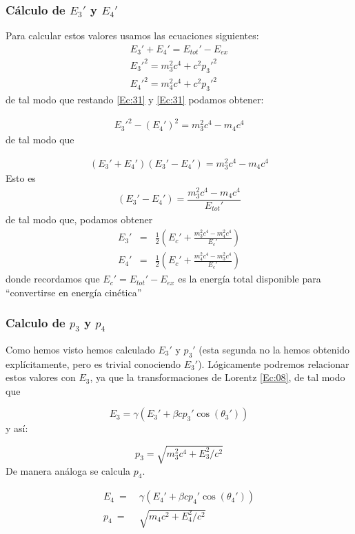 \subsubsection{Cálculo de $E_3'$ y $E_4'$}
Para calcular estos valores usamos las ecuaciones siguientes:
\begin{eqnarray}
    E_3' + E_4' = E_{tot}' - E_{ex}  \\
    E_3'^2 = m_3^2 c^4+ c^2 p_3'^2 \label{Ec:31} \\ 
    E_4'^2 = m_4^2 c^4+ c^2 p_3'^2  \label{Ec:32}
\end{eqnarray}
de tal modo que restando \ref{Ec:31} y \ref{Ec:31} podamos obtener:

\begin{eqnarray}
    E_3'^2-(E_4')^2= m_3^2c^4 - m_4c^4
\end{eqnarray}
de tal modo que

\begin{eqnarray}
   (E_3'+E_4')(E_3'-E_4') =  m_3^2c^4 - m_4c^4
\end{eqnarray}
Esto es
\begin{eqnarray}
(E_3'-E_4') =  \dfrac{m_3^2c^4 - m_4c^4}{E_{tot}'}
\end{eqnarray}
de tal modo que, podamos obtener
\begin{eqnarray}
    E_3 ' & = & \frac{1}{2} \left( E_{c}' + \frac{m_3^2c^4- m_4^2c^4}{E_{c}'} \right) \\
    E_4 ' & = & \frac{1}{2} \left( E_{c}' + \frac{m_4^2c^4- m_3^2c^4}{E_{c}'} \right) 
\end{eqnarray}
donde recordamos que $E_c'=E_{tot}'-E_{ex}$ es la energía total disponible para ``convertirse en energía cinética''

\subsubsection{Calculo de $p_3$ y $p_4$}
Como hemos visto hemos calculado $E_3'$ y $p_3'$ (esta segunda no la hemos obtenido explícitamente, pero es trivial conociendo $E_3'$). Lógicamente podremos relacionar estos valores con $E_3$, ya que la transformaciones de Lorentz \ref{Ec:08}, de tal modo que

\begin{equation}
    E_3 = \gamma (E_3'  + \beta c p_3' \cos (\theta_3'))
\end{equation}
y así:

\begin{equation}
    p_3 = \sqrt{m_3^2 c^4 + E_3^2/c^2}
\end{equation}
De manera análoga se calcula $p_4$.

\begin{equation}
    \begin{array}{ll}
    E_4 \ = &\  \gamma (E_4'  + \beta c p_4' \cos (\theta_4')) \\[1em]
    p_4 \ = & \ \sqrt{m_4 c^2 + E_4^2/c^2}
    \end{array}
\end{equation}

